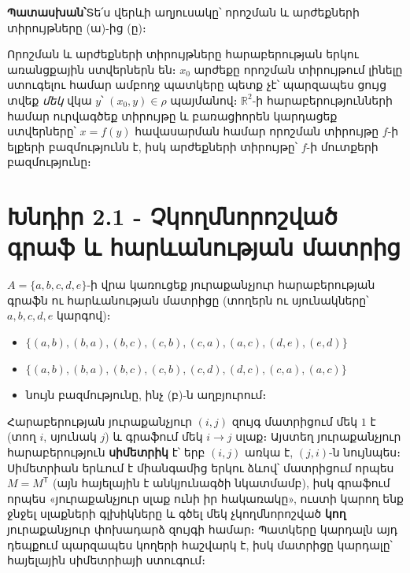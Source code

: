 \documentclass[11pt,a4paper]{article}
\newcommand{\R}{\mathbb{R}}
\newcommand{\answer}[1]{\begin{answerbox}\centering\textbf{Պատասխան՝}\quad #1\end{answerbox}}
\begin{document}
\answer{Տե՛ս վերևի աղյուսակը՝ որոշման և արժեքների տիրույթները (ա)-ից (ը)։}

\begin{methodbox}
Որոշման և արժեքների տիրույթները հարաբերության երկու առանցքային ստվերներն
են։ $x_0$ արժեքը որոշման տիրույթում լինելը ստուգելու համար ամբողջ պատկերը պետք չէ՝ պարզապես ցույց
տվեք \emph{մեկ} վկա $y$՝ $(x_0,y)\in\rho$ պայմանով։ $\R^2$-ի հարաբերությունների համար ուրվագծեք
տիրույթը և բառացիորեն կարդացեք ստվերները՝ $x=f(y)$ հավասարման համար որոշման տիրույթը $f$-ի ելքերի
բազմությունն է, իսկ արժեքների տիրույթը՝ $f$-ի մուտքերի բազմությունը։
\end{methodbox}

\section*{Խնդիր 2.1 - Չկողմնորոշված գրաֆ և հարևանության մատրից}

\begin{problembox}[2.1]
$A=\{a,b,c,d,e\}$-ի վրա կառուցեք յուրաքանչյուր հարաբերության գրաֆն ու հարևանության մատրիցը (տողերն ու
սյունակները՝ $a,b,c,d,e$ կարգով)։
\begin{itemize}[leftmargin=1.6em,nosep]
\item[ա)] $\{(a,b),(b,a),(b,c),(c,b),(c,a),(a,c),(d,e),(e,d)\}$
\item[բ)] $\{(a,b),(b,a),(b,c),(c,b),(c,d),(d,c),(c,a),(a,c)\}$
\item[գ)] նույն բազմությունը, ինչ (բ)-ն աղբյուրում։
\end{itemize}
\end{problembox}

\begin{ideabox}
Հարաբերության յուրաքանչյուր $(i,j)$ զույգ մատրիցում մեկ $1$ է (տող $i$, սյունակ $j$) և գրաֆում մեկ
$i\to j$ սլաք։ Այստեղ յուրաքանչյուր հարաբերություն \textbf{սիմետրիկ} է՝ երբ $(i,j)$ առկա է, $(j,i)$-ն
նույնպես։ Սիմետրիան երևում է միանգամից երկու ձևով՝ մատրիցում որպես $M=M^{\mathsf T}$ (այն հայելային է
անկյունագծի նկատմամբ), իսկ գրաֆում որպես «յուրաքանչյուր սլաք ունի իր հակառակը», ուստի կարող ենք ջնջել
սլաքների գլխիկները և գծել մեկ չկողմնորոշված \textbf{կող} յուրաքանչյուր փոխադարձ զույգի համար։ Պատկերը
կարդալն այդ դեպքում պարզապես կողերի հաշվարկ է, իսկ մատրիցը կարդալը՝ հայելային սիմետրիայի ստուգում։
\end{ideabox}
\end{document}
